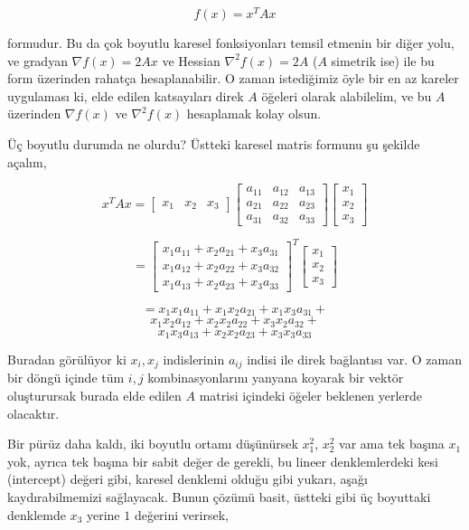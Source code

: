\documentclass[12pt,fleqn]{article}\usepackage{../../common}
\begin{document}
$$
f(x) = x^T A x
$$

formudur. Bu da çok boyutlu karesel fonksiyonları temsil etmenin bir diğer
yolu, ve gradyan $\nabla f (x) = 2 A x$ ve Hessian $\nabla^2 f(x) = 2 A$
($A$ simetrik ise) ile bu form üzerinden rahatça hesaplanabilir. O zaman
istediğimiz öyle bir en az kareler uygulaması ki, elde edilen katsayıları
direk $A$ öğeleri olarak alabilelim, ve bu $A$ üzerinden $\nabla f(x)$ ve
$\nabla^2 f(x)$ hesaplamak kolay olsun.

Üç boyutlu durumda ne olurdu? Üstteki karesel matris formunu şu şekilde
açalım, 

$$
x^T A x =
\left[\begin{array}{ccc}
x_1 & x_2 & x_3
\end{array}\right]
\left[\begin{array}{ccc}
a_{11} & a_{12} & a_{13} \\
a_{21} & a_{22} & a_{23} \\
a_{31} & a_{32} & a_{33} 
\end{array}\right]
\left[\begin{array}{c}
x_1 \\ x_2 \\ x_3
\end{array}\right]
$$

$$
= \left[\begin{array}{c}
x_1 a_{11} + x_2 a_{21} + x_3 a_{31} \\
x_1 a_{12} + x_2 a_{22} + x_3 a_{32} \\
x_1 a_{13} + x_2 a_{23} + x_3 a_{33} 
\end{array}\right]^T 
\left[\begin{array}{c}
x_1 \\ x_2 \\ x_3
\end{array}\right]
$$

$$
= x_1 x_1 a_{11} + x_1 x_2 a_{21} + x_1 x_3 a_{31} +
$$
$$
x_1 x_2 a_{12} + x_2 x_2 a_{22} + x_3 x_2 a_{32} +  
$$
$$
x_1 x_3 a_{13} + x_2 x_2 a_{23} + x_3 x_3 a_{33} 
$$

Buradan görülüyor ki $x_{i},x_{j}$ indislerinin $a_{ij}$ indisi ile direk
bağlantısı var. O zaman bir döngü içinde tüm $i,j$ kombinasyonlarını
yanyana  koyarak bir vektör oluşturursak burada elde edilen $A$ matrisi
içindeki öğeler beklenen yerlerde olacaktır. 

Bir pürüz daha kaldı, iki boyutlu ortamı düşünürsek $x_1^2$, $x_2^2$ var
ama tek başına $x_1$ yok, ayrıca tek başına bir sabit değer de gerekli, bu
lineer denklemlerdeki kesi (intercept) değeri gibi, karesel denklemi olduğu
gibi yukarı, aşağı kaydırabilmemizi sağlayacak. Bunun çözümü basit, üstteki
gibi üç boyuttaki denklemde $x_3$ yerine $1$ değerini verirsek, 
\end{document}
